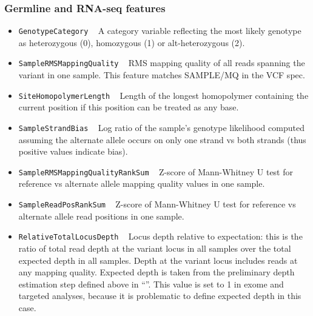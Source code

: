 \documentclass{article}
\begin{document}
\subsubsection{Germline and RNA-seq features}
\begin{itemize}

    \item \texttt{GenotypeCategory} ~ A category variable reflecting the most likely genotype as heterozygous (0), homozygous (1) or alt-heterozygous (2).

    \item \texttt{SampleRMSMappingQuality} ~ RMS mapping quality of all reads spanning the variant in one sample. This feature matches SAMPLE/MQ in the VCF spec.

    \item \texttt{SiteHomopolymerLength} ~ Length of the longest homopolymer containing the current position if this position can be treated as any base.

    \item \texttt{SampleStrandBias} ~ Log ratio of the sample's genotype likelihood computed assuming the alternate allele occurs on only one strand vs both strands (thus positive values indicate bias).

    \item \texttt{SampleRMSMappingQualityRankSum} ~ Z-score of Mann-Whitney U test for reference vs alternate allele mapping quality values in one sample.

    \item \texttt{SampleReadPosRankSum} ~ Z-score of Mann-Whitney U test for reference vs alternate allele read positions in one sample.

    \item \texttt{RelativeTotalLocusDepth} ~ Locus depth relative to expectation: this is the ratio of total read depth at the variant locus in all samples over the total expected depth in all samples. Depth at the variant locus includes reads at any mapping quality. Expected depth is taken from the preliminary depth estimation step defined above in ``''. This value is set to 1 in exome and targeted analyses, because it is problematic to define expected depth in this case.


\end{itemize}
\end{document}
